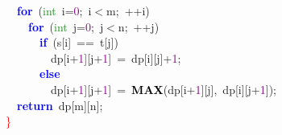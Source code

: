 \mbox{}\ \ \textbf{\textcolor{Blue}{for}}\ \textcolor{BrickRed}{(}\textcolor{ForestGreen}{int}\ i\textcolor{BrickRed}{=}\textcolor{Purple}{0}\textcolor{BrickRed}{;}\ i\textcolor{BrickRed}{$<$}m\textcolor{BrickRed}{;}\ \textcolor{BrickRed}{++}i\textcolor{BrickRed}{)} \\
\mbox{}\ \ \ \ \textbf{\textcolor{Blue}{for}}\ \textcolor{BrickRed}{(}\textcolor{ForestGreen}{int}\ j\textcolor{BrickRed}{=}\textcolor{Purple}{0}\textcolor{BrickRed}{;}\ j\textcolor{BrickRed}{$<$}n\textcolor{BrickRed}{;}\ \textcolor{BrickRed}{++}j\textcolor{BrickRed}{)} \\
\mbox{}\ \ \ \ \ \ \textbf{\textcolor{Blue}{if}}\ \textcolor{BrickRed}{(}s\textcolor{BrickRed}{[}i\textcolor{BrickRed}{]}\ \textcolor{BrickRed}{==}\ t\textcolor{BrickRed}{[}j\textcolor{BrickRed}{])} \\
\mbox{}\ \ \ \ \ \ \ \ dp\textcolor{BrickRed}{[}i\textcolor{BrickRed}{+}\textcolor{Purple}{1}\textcolor{BrickRed}{][}j\textcolor{BrickRed}{+}\textcolor{Purple}{1}\textcolor{BrickRed}{]}\ \textcolor{BrickRed}{=}\ dp\textcolor{BrickRed}{[}i\textcolor{BrickRed}{][}j\textcolor{BrickRed}{]+}\textcolor{Purple}{1}\textcolor{BrickRed}{;} \\
\mbox{}\ \ \ \ \ \ \textbf{\textcolor{Blue}{else}} \\
\mbox{}\ \ \ \ \ \ \ \ dp\textcolor{BrickRed}{[}i\textcolor{BrickRed}{+}\textcolor{Purple}{1}\textcolor{BrickRed}{][}j\textcolor{BrickRed}{+}\textcolor{Purple}{1}\textcolor{BrickRed}{]}\ \textcolor{BrickRed}{=}\ \textbf{\textcolor{Black}{MAX}}\textcolor{BrickRed}{(}dp\textcolor{BrickRed}{[}i\textcolor{BrickRed}{+}\textcolor{Purple}{1}\textcolor{BrickRed}{][}j\textcolor{BrickRed}{],}\ dp\textcolor{BrickRed}{[}i\textcolor{BrickRed}{][}j\textcolor{BrickRed}{+}\textcolor{Purple}{1}\textcolor{BrickRed}{]);} \\
\mbox{}\ \ \textbf{\textcolor{Blue}{return}}\ dp\textcolor{BrickRed}{[}m\textcolor{BrickRed}{][}n\textcolor{BrickRed}{];} \\
\mbox{}\textcolor{Red}{\}} \\


